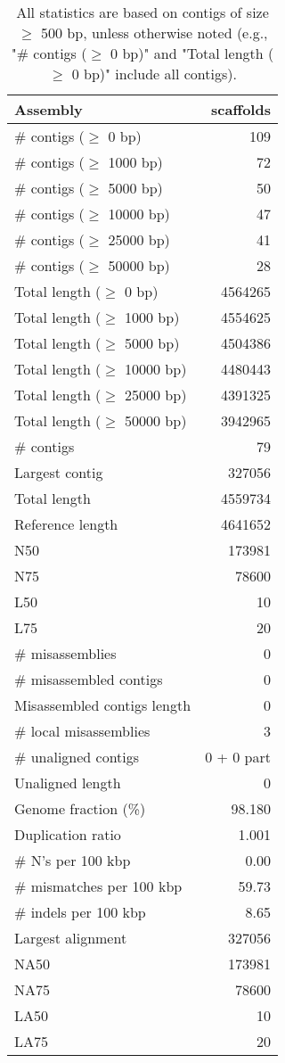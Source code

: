 \documentclass[12pt,a4paper]{article}
\begin{document}
\begin{table}[ht]
\begin{center}
\caption{All statistics are based on contigs of size $\geq$ 500 bp, unless otherwise noted (e.g., "\# contigs ($\geq$ 0 bp)" and "Total length ($\geq$ 0 bp)" include all contigs).}
\begin{tabular}{|l*{1}{|r}|}
\hline
Assembly & scaffolds \\ \hline
\# contigs ($\geq$ 0 bp) & 109 \\ \hline
\# contigs ($\geq$ 1000 bp) & 72 \\ \hline
\# contigs ($\geq$ 5000 bp) & 50 \\ \hline
\# contigs ($\geq$ 10000 bp) & 47 \\ \hline
\# contigs ($\geq$ 25000 bp) & 41 \\ \hline
\# contigs ($\geq$ 50000 bp) & 28 \\ \hline
Total length ($\geq$ 0 bp) & 4564265 \\ \hline
Total length ($\geq$ 1000 bp) & 4554625 \\ \hline
Total length ($\geq$ 5000 bp) & 4504386 \\ \hline
Total length ($\geq$ 10000 bp) & 4480443 \\ \hline
Total length ($\geq$ 25000 bp) & 4391325 \\ \hline
Total length ($\geq$ 50000 bp) & 3942965 \\ \hline
\# contigs & 79 \\ \hline
Largest contig & 327056 \\ \hline
Total length & 4559734 \\ \hline
Reference length & 4641652 \\ \hline
N50 & 173981 \\ \hline
N75 & 78600 \\ \hline
L50 & 10 \\ \hline
L75 & 20 \\ \hline
\# misassemblies & 0 \\ \hline
\# misassembled contigs & 0 \\ \hline
Misassembled contigs length & 0 \\ \hline
\# local misassemblies & 3 \\ \hline
\# unaligned contigs & 0 + 0 part \\ \hline
Unaligned length & 0 \\ \hline
Genome fraction (\%) & 98.180 \\ \hline
Duplication ratio & 1.001 \\ \hline
\# N's per 100 kbp & 0.00 \\ \hline
\# mismatches per 100 kbp & 59.73 \\ \hline
\# indels per 100 kbp & 8.65 \\ \hline
Largest alignment & 327056 \\ \hline
NA50 & 173981 \\ \hline
NA75 & 78600 \\ \hline
LA50 & 10 \\ \hline
LA75 & 20 \\ \hline
\end{tabular}
\end{center}
\end{table}
\end{document}
